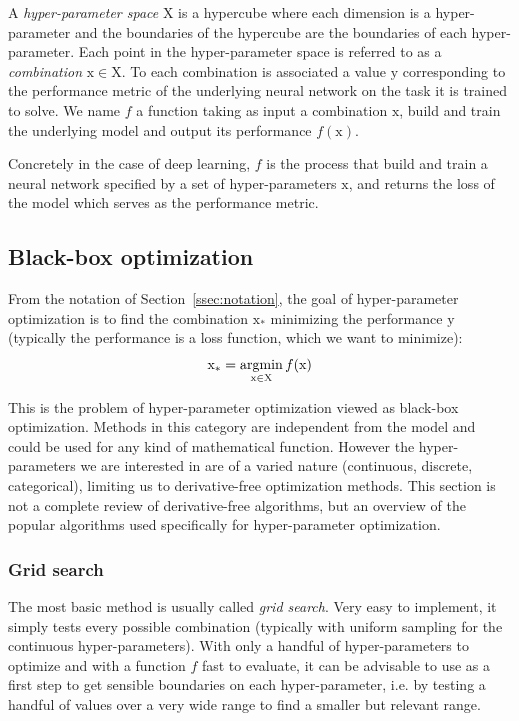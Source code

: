 A \textit{hyper-parameter space} $\mathrm{X}$ is a hypercube where each dimension is a hyper-parameter and the boundaries of the hypercube are the boundaries of each hyper-parameter. Each point in the hyper-parameter space is referred to as a \textit{combination} $\mathrm{x} \in \mathrm{X}$. To each combination is associated a value $\mathrm{y}$ corresponding to the performance metric of the underlying neural network on the task it is trained to solve. We name $f$ a function taking as input a combination $\mathrm{x}$, build and train the underlying model and output its performance $f\left( \mathrm{x} \right)$.

Concretely in the case of deep learning, $f$ is the process that build and train a neural network specified by a set of hyper-parameters $\mathrm{x}$, and returns the loss of the model which serves as the performance metric.

\subsection{Black-box optimization}
\label{ssec:black_box}

From the notation of Section~\ref{ssec:notation}, the goal of hyper-parameter optimization is to find the combination $\mathrm{x_*}$ minimizing the performance $\mathrm{y}$ (typically the performance is a loss function, which we want to minimize):
\begin{equation}
	\mathrm{x_*} = \operatorname*{argmin}_{\mathrm{x} \in \mathrm{X}} f(\mathrm{x})
\end{equation}

This is the problem of hyper-parameter optimization viewed as black-box optimization. Methods in this category are independent from the model and could be used for any kind of mathematical function. However the hyper-parameters we are interested in are of a varied nature (continuous, discrete, categorical), limiting us to derivative-free optimization methods. This section is not a complete review of derivative-free algorithms, but an overview of the popular algorithms used specifically for hyper-parameter optimization.

\subsubsection{Grid search}

The most basic method is usually called \textit{grid search}. Very easy to implement, it simply tests every possible combination (typically with uniform sampling for the continuous hyper-parameters). With only a handful of hyper-parameters to optimize and with a function $f$ fast to evaluate, it can be advisable to use as a first step to get sensible boundaries on each hyper-parameter, i.e. by testing a handful of values over a very wide range to find a smaller but relevant range.

